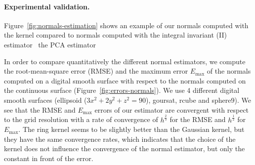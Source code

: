 \paragraph{Experimental validation.}

Figure~\ref{fig:normals-estimation} shows an example of our normals computed
with the  kernel compared to normals
computed with the integral invariant (II) estimator~\cite{Lachaud:2017-lnm}
 the PCA estimator~\cite{mitra:2003-acm}

In order to compare quantitatively the different normal estimators, we compute the
root-mean-square error (RMSE) and the maximum error $E_{\max}$ of the
normals computed on a digital smooth surface with respect to the normals computed
on the continuous surface (Figure~\ref{fig:errors-normals}). We use 4 different digital smooth surfaces (ellipsoid ($3x^2+2y^2+z^2=90$),
goursat, rcube and sphere9). We see that the RMSE and $E_{\max}$ errors of our
estimator are convergent with respect to the grid resolution with a
rate of convergence of $h^{\frac{2}{3}}$ for the RMSE and $h^{\frac{1}{2}}$ for
$E_{\max}$. The ring kernel seems to be slightly better than the Gaussian kernel,
but they have the same convergence rates, which indicates that the choice of the kernel
does not influence the convergence of the normal estimator, but only the constant in front of the error.


